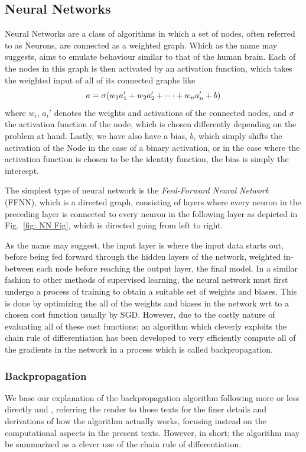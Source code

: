 \documentclass[reprint, english, nofootinbib]{revtex4-2}
\begin{document}
\subsection{Neural Networks}
\noindent
Neural Networks are a class of algorithms in which a set of nodes, often referred to as Neurons, are connected as a weighted graph. Which as the name may suggests, aims to emulate behaviour similar to that of the human brain. Each of the nodes in this graph is then activated by an activation function, which takes the weighted input of all of its connected graphs like
\begin{equation}
    a = \sigma\qty(w_1 a_1' + w_2 a_2' + \dots + w_n a_n' + b)
\end{equation}
where $w_i$, $a_i'$ denotes the weights and activations of the connected nodes, and $\sigma$ the activation function of the node, which is chosen differently depending on the problem at hand. Lastly, we have also have a bias, $b$, which simply shifts the activation of the Node in the case of a binary activation, or in the case where the activation function is chosen to be the identity function, the bias is simply the intercept.

The simplest type of neural network is the \textit{Feed-Forward Neural Network} (FFNN), which is a directed graph, consisting of layers where every neuron in the preceding layer is connected to every neuron in the following layer as depicted in Fig.~\ref{fig: NN Fig}, which is directed going from left to right.

As the name may suggest, the input layer is where the input data starts out, before being fed forward through the hidden layers of the network, weighted in-between each node before reaching the output layer, the final model. In a similar fashion to other methods of supervised learning, the neural network must first undergo a process of training to obtain a suitable set of weights and biases. This is done by optimizing the all of the weights and biases in the network wrt to a chosen cost function usually by SGD. However, due to the costly nature of evaluating all of these cost functions; an algorithm which cleverly exploits the chain rule of differentiation has been developed to very efficiently compute all of the gradients in the network in a process which is called backpropagation.

\subsubsection{Backpropagation}
\noindent
We base our explanation of the backpropagation algorithm following more or less directly \textcite{Nielsen} and \textcite{Mehta_2019}, referring the reader to those texts for the finer details and derivations of how the algorithm actually works, focusing instead on the computational aspects in the present texts. However, in short; the algorithm may be summarized as a clever use of the chain rule of differentiation.
\end{document}
